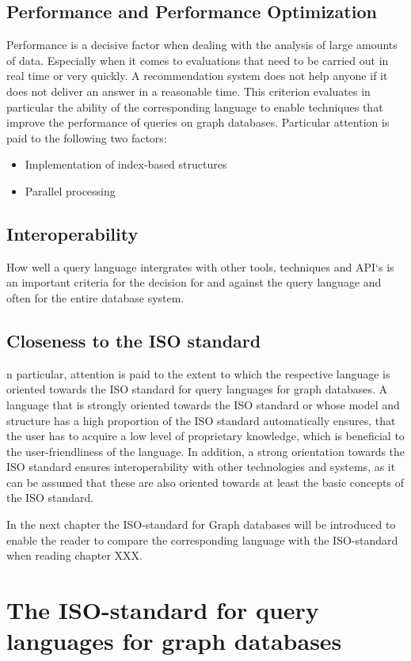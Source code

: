 \section{Performance and Performance Optimization}
Performance is a decisive factor when dealing with the analysis of large amounts of data. 
Especially when it comes to evaluations that need to be carried out in real time or very quickly. 
A recommendation system does not help anyone if it does not deliver an answer in a reasonable time.
This criterion evaluates in particular the ability of the corresponding language to enable techniques 
that improve the performance of queries on graph databases.
Particular attention is paid to the following two factors:
\begin{itemize}
	\item Implementation of index-based structures
	\item Parallel processing
\end{itemize}


\section{Interoperability}
How well a query language intergrates with other tools, techniques and API`s is an important
criteria for the decision for and against the query language and often for the entire 
database system.

\section{Closeness to the ISO standard}
n particular, attention is paid to the extent to which the respective language is oriented 
towards the ISO standard for query languages for graph databases.
A language that is strongly oriented towards the ISO standard or whose model and structure 
has a high proportion of the ISO standard automatically ensures, 
that the user has to acquire a low level of proprietary knowledge, 
which is beneficial to the user-friendliness of the language.
In addition, a strong orientation towards the ISO standard ensures interoperability 
with other technologies and systems, 
as it can be assumed that these are also oriented towards at least the basic concepts of the ISO standard.

In the next chapter the ISO-standard for Graph databases will be introduced to enable the reader 
to compare the corresponding language with the ISO-standard when reading chapter XXX.

\chapter{The ISO-standard for query languages for graph databases}
